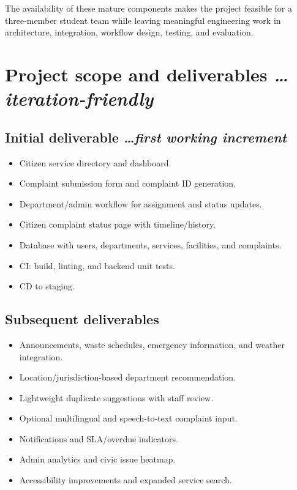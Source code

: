 \documentclass[11pt,a4paper]{article}
\newcommand{\BvrHint}[1]{{\normalfont\normalsize\itshape\hfill #1}}
\begin{document}
The availability of these mature components makes the project feasible for a three-member student team while leaving meaningful engineering work in architecture, integration, workflow design, testing, and evaluation.

\section{Project scope and deliverables %
\BvrHint{\ldots iteration-friendly}}
\subsection{Initial deliverable %
\BvrHint{\ldots first working increment}}
\begin{itemize}[leftmargin=0.7cm]
    \item Citizen service directory and dashboard.
    \item Complaint submission form and complaint ID generation.
    \item Department/admin workflow for assignment and status updates.
    \item Citizen complaint status page with timeline/history.
    \item Database with users, departments, services, facilities, and complaints.
    \item CI: build, linting, and backend unit tests.
    \item CD to staging.
\end{itemize}

\subsection{Subsequent deliverables}
\begin{itemize}[leftmargin=0.7cm]
    \item Announcements, waste schedules, emergency information, and weather integration.
    \item Location/jurisdiction-based department recommendation.
    \item Lightweight duplicate suggestions with staff review.
    \item Optional multilingual and speech-to-text complaint input.
    \item Notifications and SLA/overdue indicators.
    \item Admin analytics and civic issue heatmap.
    \item Accessibility improvements and expanded service search.
\end{itemize}
\end{document}
